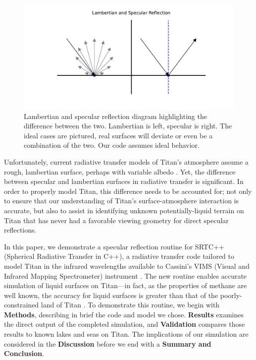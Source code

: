 \documentclass[twocolumn,linenumbers]{aastex631}
\begin{document}
\begin{figure}[htbp]
\centering
\includegraphics[scale = 0.4]{LambertSpec.pdf}
\centering
\caption{Lambertian and specular reflection diagram highlighting the difference between the two. Lambertian is left, specular is right. The ideal cases are pictured, real surfaces will deviate or even be a combination of the two. Our code assumes ideal behavior.}
\label{fig:1}
\end{figure}

Unfortunately, current radiative transfer models of Titan's atmosphere assume a rough, lambertian surface, perhaps with variable albedo \citep{Griffith2012, Xu2013, Corlies2021, Rannou2021, EsSayeh2023}. Yet, the difference between specular and lambertian surfaces in radiative transfer is significant. In order to properly model Titan, this difference needs to be accounted for; not only to ensure that our understanding of Titan's surface-atmosphere interaction is accurate, but also to assist in identifying unknown potentially-liquid terrain on Titan that has never had a favorable viewing geometry for direct specular reflections. 

In this paper, we demonstrate a specular reflection routine for SRTC++ (Spherical Radiative Transfer in C++), a radiative transfer code tailored to model Titan in the infrared wavelengths available to Cassini's VIMS (Visual and Infrared Mapping Spectrometer) instrument \citep{Barnes2018}. The new routine enables accurate simulation of liquid surfaces on Titan---in fact, as the properties of methane are well known, the accuracy for liquid surfaces is greater than that of the poorly-constrained land of Titan \citep{Trainer2018}. To demonstrate this routine, we begin with \textbf{Methods}, describing in brief the code and model we chose. \textbf{Results} examines the direct output of the completed simulation, and \textbf{Validation} compares those results to known lakes and seas on Titan. The implications of our simulation are considered in the \textbf{Discussion} before we end with a \textbf{Summary and Conclusion}.
\end{document}
